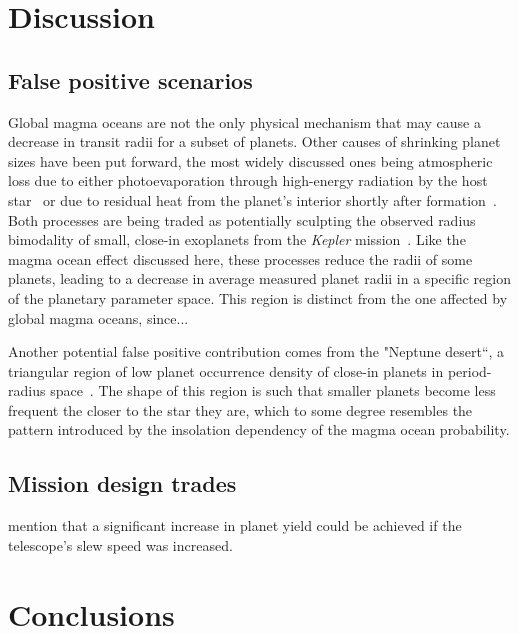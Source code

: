 \documentclass[twocolumn]{aastex631}
\begin{document}
\section{Discussion}

\subsection{False positive scenarios}
\begin{note}
Global magma oceans are not the only physical mechanism that may cause a decrease in transit radii for a subset of planets.
Other causes of shrinking planet sizes have been put forward, the most widely discussed ones being atmospheric loss due to either photoevaporation through high-energy radiation by the host star~\citep[e.g.,][]{Owen2013,Jin2014,Mordasini2020a} or due to residual heat from the planet's interior shortly after formation~\citep{Ginzburg2016b,Ginzburg2018,Gupta2019}.
    Both processes are being traded as potentially sculpting the observed radius bimodality of small, close-in exoplanets from the \textit{Kepler} mission~\citep{Fulton2017,VanEylen2018}.
    Like the magma ocean effect discussed here, these processes reduce the radii of some planets, leading to a decrease in average measured planet radii in a specific region of the planetary parameter space.
    This region is distinct from the one affected by global magma oceans, since... 

    Another potential false positive contribution comes from the "Neptune desert``, a triangular region of low planet occurrence density of close-in planets in period-radius space~\citep{Szabo2011,Mazeh2016,Dreizler2020b}.
    The shape of this region is such that smaller planets become less frequent the closer to the star they are, which to some degree resembles the pattern introduced by the insolation dependency of the magma ocean probability.
\end{note}

\subsection{Mission design trades}\label{sec:mission-design-trades}
\citet{Penny2019} mention that a significant increase in planet yield could be achieved if the telescope's slew speed was increased.

\section{Conclusions}




\end{document}
